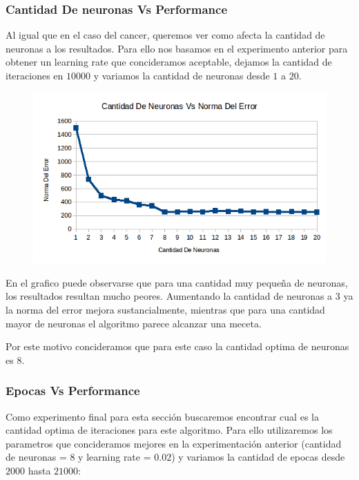 \subsubsection{Cantidad De neuronas Vs Performance}

Al igual que en el caso del cancer, queremos ver como afecta la cantidad de neuronas a los resultados. Para ello nos basamos en el experimento anterior para obtener un learning rate que concideramos aceptable, dejamos la cantidad de iteraciones en $10000$ y variamos la cantidad de neuronas desde $1$ a $20$.

\begin{figure}[h!]
  \centering
    \includegraphics[scale=0.4]{ej2/test_neuronas.png}
\end{figure}

En el grafico puede observarse que para una cantidad muy pequeña de neuronas, los resultados resultan mucho peores. Aumentando la cantidad de neuronas a $3$ ya la norma del error mejora sustancialmente, mientras que para una cantidad mayor de neuronas el algoritmo parece alcanzar una meceta.

Por este motivo concideramos que para este caso la cantidad optima de neuronas es $8$.


\subsubsection{Epocas Vs Performance}

Como experimento final para esta sección buscaremos encontrar cual es la cantidad optima de iteraciones para este algoritmo. Para ello utilizaremos los parametros que concideramos mejores en la experimentación anterior (cantidad de neuronas = 8 y learning rate = 0.02) y variamos la cantidad de epocas desde $2000$ hasta $21000$:

